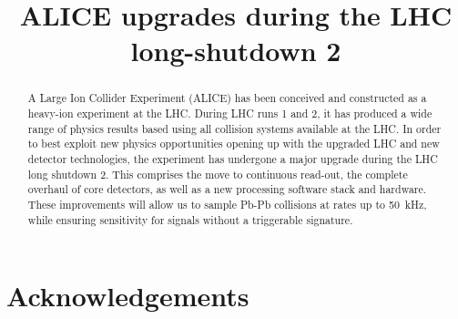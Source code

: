 \documentclass[ALICE,manyauthors]{cernphprep}
\begin{document}
\begin{titlepage}

\title{ALICE upgrades during the LHC long-shutdown 2}


\begin{abstract}
A Large Ion Collider Experiment (ALICE) has been conceived and constructed as a heavy-ion experiment at the LHC. During LHC runs 1 and 2, it has produced a wide range of physics results based using all collision systems available at the LHC.
In order to best exploit new physics opportunities opening up with the upgraded LHC and new detector technologies, the experiment has undergone a major upgrade during the LHC long shutdown 2. This comprises the move to continuous read-out, the complete overhaul of core detectors, as well as a new processing software stack and hardware. 
These improvements will allow us to sample Pb-Pb collisions at rates up to \SI{50}{\kilo\hertz}, while ensuring sensitivity for signals without a triggerable signature.
\end{abstract}
\end{titlepage}

\setcounter{page}{2} %

\tableofcontents
\listoffigures
\listoftables















\cleardoublepage
\newenvironment{acknowledgement}{\relax}{\relax}
\begin{acknowledgement}
\section*{Acknowledgements}
%
\end{acknowledgement}
\end{document}
